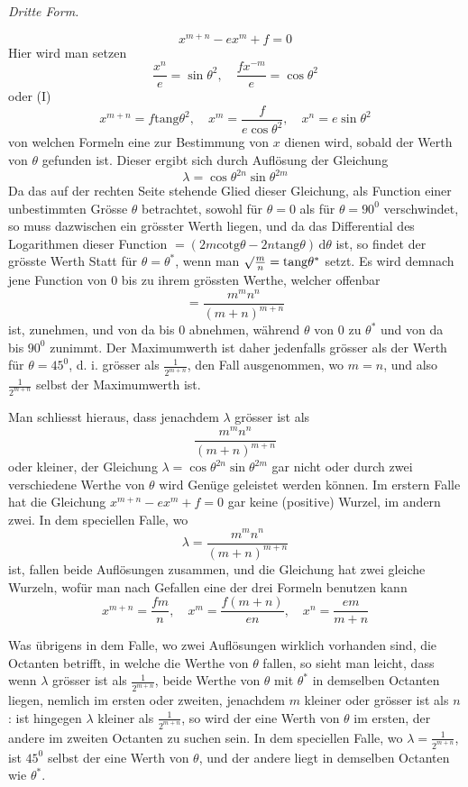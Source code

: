 \begin{center}\textit{Dritte Form.}\end{center}
\[
x^{m+n}-ex^m+f=0
\]
Hier wird man setzen
\[
\frac{x^n}{e}=\sin\theta^2,\quad
\frac{fx^{-m}}{e}=\cos\theta^2
\]
oder (I)
\[
x^{m+n}=f\mathrm{tang}\theta^2,\quad
x^m=\frac{f}{e\cos\theta^2},\quad
x^n=e\sin\theta^2
\]
von welchen Formeln eine zur Bestimmung von $x$ dienen wird, sobald der Werth
von $\theta$ gefunden ist. Dieser ergibt sich durch Auflösung der Gleichung
\[
\lambda=\cos\theta^{2n}\sin\theta^{2m}
\]
Da das auf der rechten Seite stehende Glied dieser Gleichung, als Function einer
unbestimmten Grösse $\theta$ betrachtet, sowohl für $\theta=0$ als für $\theta=90^0$ verschwindet, so muss dazwischen ein grösster Werth liegen, und da das Differential des
Logarithmen dieser Function $=(2m\mathrm{cotg}\theta-2n\mathrm{tang}\theta)\,\mathrm{d}\theta$ ist, so findet der grösste
Werth Statt für $\theta=\theta^*$, wenn man $\surd\frac{m}{n}=\mathrm{tang}\theta^*$ setzt. Es wird demnach jene
Function von $0$ bis zu ihrem grössten Werthe, welcher offenbar
\[
=\frac{m^m n^n}{(m+n)^{m+n}}
\]
ist, zunehmen, und von da bis $0$ abnehmen, während $\theta$ von $0$ zu $\theta^*$ und von
da bis $90^0$ zunimmt. Der Maximumwerth ist daher jedenfalls grösser als der
Werth für $\theta=45^0$, d. i. grösser als $\frac{1}{2^{m+n}}$, den Fall ausgenommen, wo $m=n$,
und also $\frac{1}{2^{m+n}}$ selbst der Maximumwerth ist.

Man schliesst hieraus, dass jenachdem $\lambda$ grösser ist als
\[
\frac{m^m n^n}{(m+n)^{m+n}}
\]
oder kleiner, der Gleichung $\lambda=\cos\theta^{2n}\sin\theta^{2m}$ gar nicht oder durch zwei verschiedene Werthe von $\theta$ wird Genüge geleistet werden können. Im erstern Falle
hat die Gleichung $x^{m+n}-ex^m+f=0$ gar keine (positive) Wurzel, im andern
zwei. In dem speciellen Falle, wo
\[
\lambda=\frac{m^m n^n}{(m+n)^{m+n}}
\]
ist, fallen beide Auflösungen zusammen, und die Gleichung hat zwei gleiche Wurzeln, wofür man nach Gefallen eine der drei Formeln benutzen kann
\[
x^{m+n}=\frac{fm}{n},\quad
x^m=\frac{f(m+n)}{en},\quad
x^n=\frac{em}{m+n}
\]

Was übrigens in dem Falle, wo zwei Auflösungen wirklich vorhanden sind,
die Octanten betrifft, in welche die Werthe von $\theta$ fallen, so sieht man leicht,
dass wenn $\lambda$ grösser ist als $\frac{1}{2^{m+n}}$, beide Werthe von $\theta$ mit $\theta^*$ in demselben Octanten liegen, nemlich im ersten oder zweiten, jenachdem $m$ kleiner oder grösser
ist als $n$: ist hingegen $\lambda$ kleiner als $\frac{1}{2^{m+n}}$, so wird der eine Werth von $\theta$ im ersten, der andere im zweiten Octanten zu suchen sein. In dem speciellen Falle,
wo $\lambda=\frac{1}{2^{m+n}}$, ist $45^0$ selbst der eine Werth von $\theta$, und der andere liegt in demselben Octanten wie $\theta^*$.

